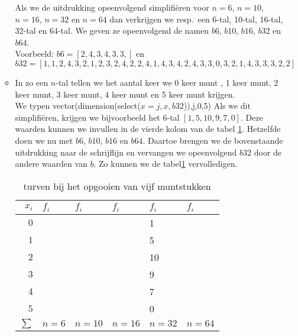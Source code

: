 \begin{small}
\begin{itemize}
\begin{itemize}
Als we de uitdrukking opeenvolgend  simplifi\"eren voor $n=6$, $n=10$, $n=16$, $n=32$ en $n=64$ dan verkrijgen we resp.\ een 6-tal, 10-tal, 16-tal, 32-tal en 64-tal. We geven ze opeenvolgend de namen $b6$, $b10$, $b16$, $b32$ en $b64$.\\
Voorbeeld: $b6=[2,4,3,4,3,3,]$ en\\
$b32=[1,1,2,4,3,2,1,2,3,2,4,2,2,4,1,4,3,4,2,4,3,3,0,3,2,1,4,3,3,3,2,2]$
\item 
In zo een $n$-tal tellen we  het aantal keer we 0 keer munt , 1 keer munt, 2 keer munt, 3 keer munt, 4 keer munt en 5 keer munt krijgen. \\We typen  \bderive  vector(dimension(select($x=j,x,b32$)),j,0,5) \ederive 
Als we dit simplifi\"eren, krijgen we bijvoorbeeld het  6-tal $[1,5,10,9,7,0]$. Deze waarden kunnen we invullen in de vierde kolom van de tabel \ref{geniaal}.
Hetzelfde doen we nu met $b6$, $b10$, $b16$ en $b64$. Daartoe brengen we de bovenstaande uitdrukking  naar de schrijflijn en vervangen we opeenvolgend $b32$ door de andere waarden van $b$. Zo kunnen we de tabel\ref{geniaal} vervolledigen.\\


\begin{table}[h]
\begin{center}
\begin{tabular}{|r|l|l|l|l|l|}
\hline
$x_i$   & $f_i$ &     $f_i$      &    $f_i$      &   $f_i$   & $f_i$\\
\hline
$0$ &  &  &  &1
& \\
\hline
$1$ &  &  & &5 & \\
\hline
$2$ & &  &  & 10 & \\
\hline
$3$ & &  &  & 9& \\
\hline
$4$ &  & & & 7&\\ 
\hline
$5$ &  &  &  &  0 & \\
\hline
$\sum$ & $n=6$ & $n=10$ & $n=16$ & $n=32$ & $n=64$\\
\hline
\end{tabular}
\caption{turven bij het opgooien van vijf muntstukken\label{geniaal}}
\end{center}
\end{table}


\end{itemize}
\end{itemize}
\end{small}
